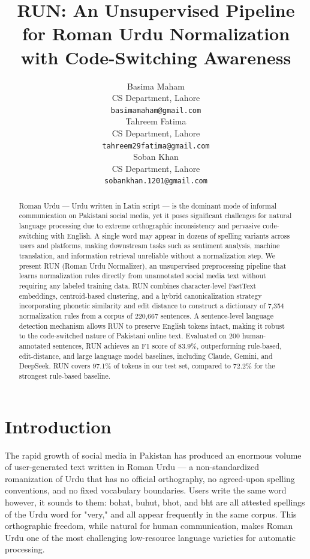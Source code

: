 \documentclass[11pt]{article}
\title{RUN: An Unsupervised Pipeline for Roman Urdu Normalization\\
with Code-Switching Awareness}
\author{
  Basima Maham \\
  CS Department, Lahore \\
  \texttt{basimamaham@gmail.com} \\\And
  Tahreem Fatima \\
  CS Department, Lahore \\
  \texttt{tahreem29fatima@gmail.com} \\\AND
  Soban Khan \\
  CS Department, Lahore \\
  \texttt{sobankhan.1201@gmail.com} \\
}
\date{}
\begin{document}
\maketitle

\begin{abstract}
Roman Urdu --- Urdu written in Latin script --- is the dominant mode of informal communication on Pakistani social media, yet it poses significant challenges for natural language processing due to extreme orthographic inconsistency and pervasive code-switching with English. A single word may appear in dozens of spelling variants across users and platforms, making downstream tasks such as sentiment analysis, machine translation, and information retrieval unreliable without a normalization step. We present RUN (Roman Urdu Normalizer), an unsupervised preprocessing pipeline that learns normalization rules directly from unannotated social media text without requiring any labeled training data. RUN 
combines character-level FastText embeddings, centroid-based clustering, and a hybrid canonicalization strategy incorporating phonetic similarity and edit distance to construct a dictionary of 7,354 normalization rules from a corpus of 220,667 sentences. A sentence-level language detection mechanism allows RUN to preserve English tokens intact, making it robust to the code-switched nature of Pakistani online text. Evaluated on 200 human-annotated sentences, RUN achieves an F1 score of 83.9\%, outperforming rule-based, edit-distance, and large language model baselines, including Claude, Gemini, and DeepSeek. RUN covers 97.1\% of tokens in our test set, compared to 72.2\% for the strongest rule-based baseline.
\end{abstract}

\section{Introduction}
The rapid growth of social media in Pakistan has produced an enormous volume of user-generated text written in Roman Urdu — a non-standardized romanization of Urdu that has no official orthography, no agreed-upon spelling conventions, and no fixed vocabulary boundaries. Users write the same word however, it sounds to them: bohat, buhut, bhot, and bht are all attested spellings of the Urdu word for "very," and all appear frequently in the same corpus. This orthographic freedom, while natural for human communication, makes Roman Urdu one of the most challenging low-resource language varieties for automatic processing.
\end{document}
